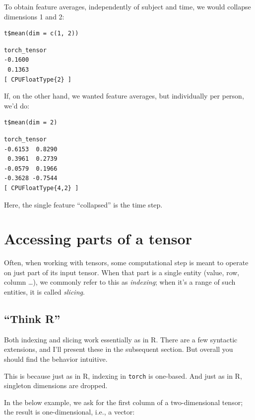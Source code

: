 \documentclass[
  letterpaper,
]{krantz}
\begin{document}
To obtain feature averages, independently of subject and time, we would
collapse dimensions 1 and 2:

\begin{verbatim}
t$mean(dim = c(1, 2))
\end{verbatim}

\begin{verbatim}
torch_tensor
-0.1600
 0.1363
[ CPUFloatType{2} ]
\end{verbatim}

If, on the other hand, we wanted feature averages, but individually per
person, we'd do:

\begin{verbatim}
t$mean(dim = 2)
\end{verbatim}

\begin{verbatim}
torch_tensor
-0.6153  0.8290
 0.3961  0.2739
-0.0579  0.1966
-0.3628 -0.7544
[ CPUFloatType{4,2} ]
\end{verbatim}

Here, the single feature ``collapsed'' is the time step.

\hypertarget{accessing-parts-of-a-tensor}{%
\section{\texorpdfstring{Accessing parts of a
tensor
}{Accessing parts of a tensor }}\label{accessing-parts-of-a-tensor}}

Often, when working with tensors, some computational step is meant to
operate on just part of its input tensor. When that part is a single
entity (value, row, column \ldots), we commonly refer to this as
\emph{indexing}; when it's a range of such entities, it is called
\emph{slicing}.

\hypertarget{think-r}{%
\subsection{``Think R''}\label{think-r}}

Both indexing and slicing work essentially as in R. There are a few
syntactic extensions, and I'll present these in the subsequent section.
But overall you should find the behavior intuitive.

This is because just as in R, indexing in \texttt{torch} is one-based.
And just as in R, singleton dimensions are dropped.

In the below example, we ask for the first column of a two-dimensional
tensor; the result is one-dimensional, i.e., a vector:
\end{document}
